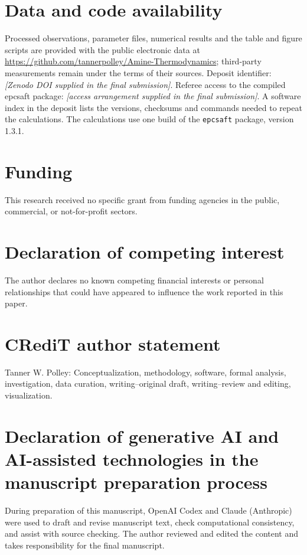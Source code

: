 \section*{Data and code availability}
Processed observations, parameter files, numerical results and the table and figure scripts are provided with the public electronic data at \url{https://github.com/tannerpolley/Amine-Thermodynamics}; third-party measurements remain under the terms of their sources.
Deposit identifier: \textit{[Zenodo DOI supplied in the final submission]}. Referee access to the compiled epcsaft package: \textit{[access arrangement supplied in the final submission]}.
A software index in the deposit lists the versions, checksums and commands needed to repeat the calculations.
The calculations use one build of the \texttt{epcsaft} package, version 1.3.1.

\section*{Funding}
This research received no specific grant from funding agencies in the public, commercial, or not-for-profit sectors.

\section*{Declaration of competing interest}
The author declares no known competing financial interests or personal relationships that could have appeared to influence the work reported in this paper.

\section*{CRediT author statement}
Tanner W. Polley: Conceptualization, methodology, software, formal analysis, investigation, data curation, writing--original draft, writing--review and editing, visualization.

\section*{Declaration of generative AI and AI-assisted technologies in the manuscript preparation process}
During preparation of this manuscript, OpenAI Codex and Claude (Anthropic) were used to draft and revise manuscript text, check computational consistency, and assist with source checking.
The author reviewed and edited the content and takes responsibility for the final manuscript.

